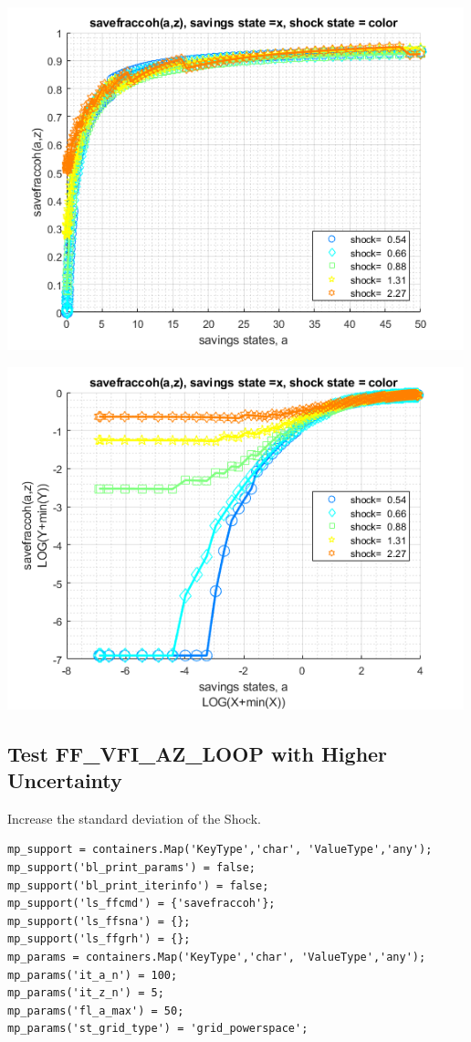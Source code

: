 \documentclass[
]{book}
\begin{document}
\includegraphics[width=5.20833in,height=\textheight]{img/fx_vfi_az_loop_images/figure_4.png}

\includegraphics[width=5.20833in,height=\textheight]{img/fx_vfi_az_loop_images/figure_5.png}

\hypertarget{test-ff_vfi_az_loop-with-higher-uncertainty}{%
\subsection{Test FF\_VFI\_AZ\_LOOP with Higher Uncertainty}\label{test-ff_vfi_az_loop-with-higher-uncertainty}}

Increase the standard deviation of the Shock.

\begin{verbatim}
mp_support = containers.Map('KeyType','char', 'ValueType','any');
mp_support('bl_print_params') = false;
mp_support('bl_print_iterinfo') = false;
mp_support('ls_ffcmd') = {'savefraccoh'};
mp_support('ls_ffsna') = {};
mp_support('ls_ffgrh') = {};
mp_params = containers.Map('KeyType','char', 'ValueType','any');
mp_params('it_a_n') = 100;
mp_params('it_z_n') = 5;
mp_params('fl_a_max') = 50;
mp_params('st_grid_type') = 'grid_powerspace';
\end{verbatim}
\end{document}
